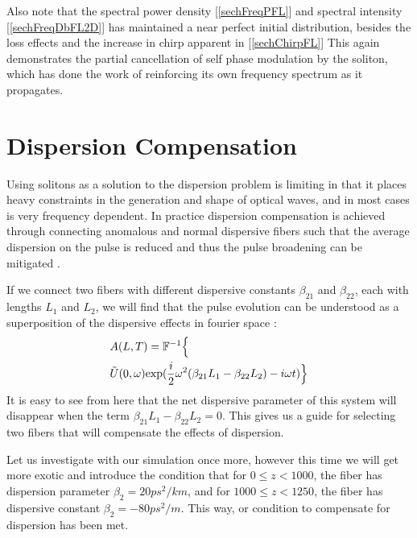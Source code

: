 \documentclass[10pt, a4paper, twocolumn]{article} %
\begin{document}
Also note that the spectral power density [\ref{sechFreqPFL}] and spectral intensity [\ref{sechFreqDbFL2D}] has maintained a near perfect initial distribution, besides the loss effects and the increase in chirp apparent in [\ref{sechChirpFL}] This again demonstrates the partial cancellation of self phase modulation by the soliton, which has done the work of reinforcing its own frequency spectrum as it propagates.

\section{Dispersion Compensation}
Using solitons as a solution to the dispersion problem is limiting in that it places heavy constraints in the generation and shape of optical waves, and in most cases is very frequency dependent. In practice dispersion compensation is achieved through connecting anomalous and normal dispersive fibers such that the average dispersion on the pulse is reduced and thus the pulse broadening can be mitigated \cite{AgrawalChap5}. 

If we connect two fibers with different dispersive constants $\beta_{21}$ and $\beta_{22}$, each with lengths $L_1$ and $L_2$, we will find that the pulse evolution can be understood as a superposition of the dispersive effects in fourier space \cite{AgrawalChap5}:
\begin{align*}
    &A(L, T) = \mathbb{F}^{-1} \Bigl\{\\ &\tilde{U}(0, \omega) \mathrm{exp}(\frac{i}{2} \omega^2(\beta_{21}L_1 - \beta_{22}L_2) - i\omega t) \Bigl\}
\end{align*}
It is easy to see from here that the net dispersive parameter of this system will disappear when the term $\beta_{21}L_1 - \beta_{22}L_2 = 0$. This gives us a guide for selecting two fibers that will compensate the effects of dispersion. 

Let us investigate with our simulation once more, however this time we will get more exotic and introduce the condition that for $0 \leq z < 1000$, the fiber has dispersion parameter $\beta_2 = 20 ps^2/km$, and for $1000 \leq z < 1250$, the fiber has dispersive constant $\beta_2 = -80 ps^2/m$. This way, or condition to compensate for dispersion has been met. 
\end{document}
